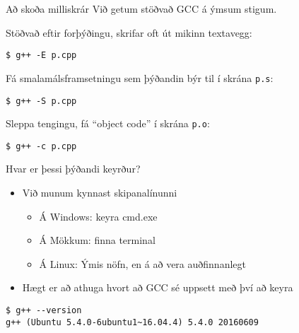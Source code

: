 \documentclass[handout]{beamer}
\begin{document}
\begin{frame}[fragile]{Að skoða milliskrár}
Við getum stöðvað GCC á ýmsum stigum.

Stöðvað eftir forþýðingu, skrifar oft út mikinn textavegg:
\begin{verbatim}
$ g++ -E p.cpp
\end{verbatim}
Fá smalamálsframsetningu sem þýðandin býr til í skrána \texttt{p.s}:
\begin{verbatim}
$ g++ -S p.cpp
\end{verbatim}
Sleppa tengingu, fá ``object code'' í skrána \texttt{p.o}:
\begin{verbatim}
$ g++ -c p.cpp
\end{verbatim}
\end{frame}



\begin{frame}[fragile]{Hvar er þessi þýðandi keyrður?}
\begin{itemize}
 \item Við munum kynnast skipanalínunni
 \begin{itemize}
  \item Á Windows: keyra cmd.exe
  \item Á Mökkum: finna terminal
  \item Á Linux: Ýmis nöfn, en á að vera auðfinnanlegt
 \end{itemize}
 \item Hægt er að athuga hvort að GCC sé uppsett með því að keyra
\end{itemize}
\begin{verbatim}
$ g++ --version
g++ (Ubuntu 5.4.0-6ubuntu1~16.04.4) 5.4.0 20160609
\end{verbatim}

\end{frame}
\end{document}

